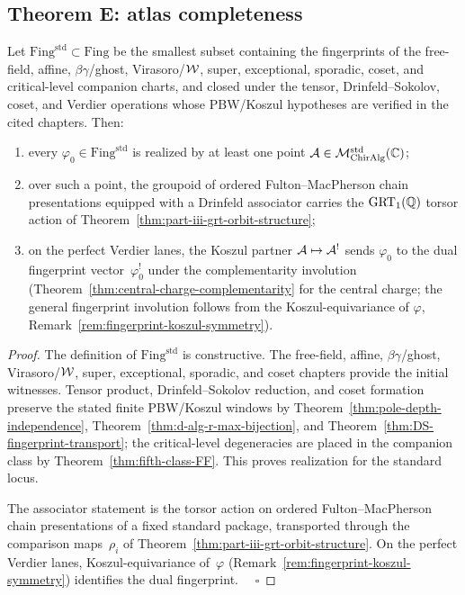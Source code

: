 \subsection{Theorem E: atlas completeness}
\label{sec:part-iii-theorem-E}

\begin{theorem}
\label{thm:part-iii-atlas-completeness}
Let $\mathrm{Fing}^{\mathrm{std}}\subset\mathrm{Fing}$ be the
smallest subset containing the fingerprints of the free-field,
affine, $\beta\gamma$/ghost, Virasoro/$\mathcal{W}$, super, exceptional,
sporadic, coset, and critical-level companion charts, and closed under
the tensor, Drinfeld--Sokolov, coset, and Verdier operations whose
PBW/Koszul hypotheses are verified in the cited chapters. Then:
\begin{enumerate}[label=\textup{(\roman*)}, leftmargin=*]
 \item every $\varphi_0\in\mathrm{Fing}^{\mathrm{std}}$ is realized
 by at least one point
 $\mathcal{A}\in\mathcal{M}_{\mathrm{ChirAlg}}^{\mathrm{std}}(\mathbb{C})$;
 \item over such a point, the groupoid of ordered Fulton--MacPherson
 chain presentations equipped with a Drinfeld associator carries the
 $\mathrm{GRT}_1(\mathbb{Q})$ torsor action of
 Theorem~\ref{thm:part-iii-grt-orbit-structure};
 \item on the perfect Verdier lanes, the Koszul partner
 $\mathcal{A} \mapsto \mathcal{A}^!$ sends $\varphi_0$ to the dual fingerprint
 vector~$\varphi_0^!$ under the complementarity involution
 \textup{(}Theorem~\ref{thm:central-charge-complementarity}
 for the central charge; the general fingerprint involution
 follows from the Koszul-equivariance of $\varphi$,
 Remark~\ref{rem:fingerprint-koszul-symmetry}\textup{)}.
\end{enumerate}
\end{theorem}
\begin{proof}
The definition of $\mathrm{Fing}^{\mathrm{std}}$ is constructive.
The free-field, affine, $\beta\gamma$/ghost, Virasoro/$\mathcal{W}$,
super, exceptional, sporadic, and coset chapters provide the initial
witnesses. Tensor product, Drinfeld--Sokolov reduction, and coset
formation preserve the stated finite PBW/Koszul windows by
Theorem~\ref{thm:pole-depth-independence},
Theorem~\ref{thm:d-alg-r-max-bijection}, and
Theorem~\ref{thm:DS-fingerprint-transport}; the critical-level
degeneracies are placed in the companion class by
Theorem~\ref{thm:fifth-class-FF}. This proves realization for the
standard locus.

The associator statement is the torsor action on ordered
Fulton--MacPherson chain presentations of a fixed standard package,
transported through the comparison maps~$\rho_i$ of
Theorem~\ref{thm:part-iii-grt-orbit-structure}. On the perfect
Verdier lanes, Koszul-equivariance of~$\varphi$
\textup{(}Remark~\ref{rem:fingerprint-koszul-symmetry}\textup{)}
identifies the dual fingerprint. $\quad\square$
\end{proof}

